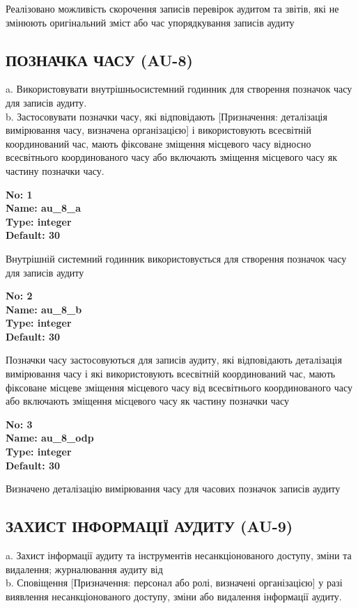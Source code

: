 \documentclass{article}
\begin{document}
{\footnotesize Реалізовано можливість скорочення записів перевірок аудитом та звітів, які не змінюють оригінальний зміст або час упорядкування записів аудиту}




\subsection{ПОЗНАЧКА ЧАСУ (AU-8)}
a. Використовувати внутрішньосистемний годинник для створення позначок часу для записів аудиту.\\ 
b. Застосовувати позначки часу, які відповідають [Призначення: деталізація вимірювання часу, визначена організацією] і використовують всесвітній координований час, мають фіксоване зміщення місцевого часу відносно всесвітнього координованого часу або включають зміщення місцевого часу як частину позначки часу.

\vspace{10pt}
{\footnotesize\bfseries
No: 1\\
Name: au\_\allowbreak{}8\_\allowbreak{}a\\
Type: integer\\
Default: 30
}

{\footnotesize Внутрішній системний годинник використовується для створення позначок часу для записів аудиту}


{\footnotesize\bfseries
No: 2\\
Name: au\_\allowbreak{}8\_\allowbreak{}b\\
Type: integer\\
Default: 30
}

{\footnotesize Позначки часу застосовуються для записів аудиту, які відповідають деталізація вимірювання часу і які використовують всесвітній координований час, мають фіксоване місцеве зміщення місцевого часу від всесвітнього координованого часу або включають зміщення місцевого часу як частину позначки часу}


{\footnotesize\bfseries
No: 3\\
Name: au\_\allowbreak{}8\_\allowbreak{}odp\\
Type: integer\\
Default: 30
}

{\footnotesize Визначено деталізацію вимірювання часу для часових позначок записів аудиту}




\subsection{ЗАХИСТ ІНФОРМАЦІЇ АУДИТУ (AU-9)}
a. Захист інформації аудиту та інструментів несанкціонованого доступу, зміни та видалення; журналювання аудиту від\\ 
b. Сповіщення [Призначення: персонал або ролі, визначені організацією] у разі виявлення несанкціонованого доступу, зміни або видалення інформації аудиту.
\end{document}
